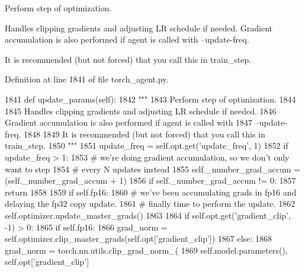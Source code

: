 \begin{DoxyVerb}Perform step of optimization.

Handles clipping gradients and adjusting LR schedule if needed.
Gradient accumulation is also performed if agent is called with
--update-freq.

It is recommended (but not forced) that you call this in train_step.
\end{DoxyVerb}
 

Definition at line 1841 of file torch\+\_\+agent.\+py.


\begin{DoxyCode}
1841     \textcolor{keyword}{def }update\_params(self):
1842         \textcolor{stringliteral}{"""}
1843 \textcolor{stringliteral}{        Perform step of optimization.}
1844 \textcolor{stringliteral}{}
1845 \textcolor{stringliteral}{        Handles clipping gradients and adjusting LR schedule if needed.}
1846 \textcolor{stringliteral}{        Gradient accumulation is also performed if agent is called with}
1847 \textcolor{stringliteral}{        --update-freq.}
1848 \textcolor{stringliteral}{}
1849 \textcolor{stringliteral}{        It is recommended (but not forced) that you call this in train\_step.}
1850 \textcolor{stringliteral}{        """}
1851         update\_freq = self.opt.get(\textcolor{stringliteral}{'update\_freq'}, 1)
1852         \textcolor{keywordflow}{if} update\_freq > 1:
1853             \textcolor{comment}{# we're doing gradient accumulation, so we don't only want to step}
1854             \textcolor{comment}{# every N updates instead}
1855             self.\_number\_grad\_accum = (self.\_number\_grad\_accum + 1) %
1856             \textcolor{keywordflow}{if} self.\_number\_grad\_accum != 0:
1857                 \textcolor{keywordflow}{return}
1858 
1859         \textcolor{keywordflow}{if} self.fp16:
1860             \textcolor{comment}{# we've been accumulating grads in fp16 and delaying the fp32 copy update.}
1861             \textcolor{comment}{# finally time to perform the update.}
1862             self.optimizer.update\_master\_grads()
1863 
1864         \textcolor{keywordflow}{if} self.opt.get(\textcolor{stringliteral}{'gradient\_clip'}, -1) > 0:
1865             \textcolor{keywordflow}{if} self.fp16:
1866                 grad\_norm = self.optimizer.clip\_master\_grads(self.opt[\textcolor{stringliteral}{'gradient\_clip'}])
1867             \textcolor{keywordflow}{else}:
1868                 grad\_norm = torch.nn.utils.clip\_grad\_norm\_(
1869                     self.model.parameters(), self.opt[\textcolor{stringliteral}{'gradient\_clip'}]

\end{DoxyCode}
